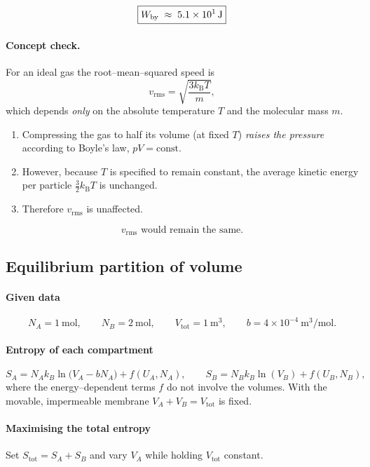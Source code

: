 \documentclass[12pt]{article}
\theoremstyle{definition} %
\theoremstyle{plain} %
\begin{document}
  \[
    \boxed{%
      W_{\text{by}} \;\approx\; \SI{5.1e1}{\joule}%
    }
\]
\paragraph{Concept check.}
For an ideal gas the root–mean–squared speed is
\[
  v_{\mathrm{rms}}
  = \sqrt{\frac{3k_{\mathrm B}T}{m}},
\]
which depends \emph{only} on the absolute temperature \(T\) and the molecular mass \(m\).

\begin{enumerate}[label=\textbf{\alph*.}]
  \item Compressing the gas to half its volume (at fixed \(T\)) \emph{raises the pressure} according to Boyle’s law, \(pV=\text{const.}\)
  \item However, because \(T\) is specified to remain constant, the average kinetic energy per particle \(\tfrac{3}{2}k_{\mathrm B}T\) is unchanged.
  \item Therefore \(v_{\mathrm{rms}}\) is unaffected.
\end{enumerate}

\[
  \boxed{\text{\(v_{\mathrm{rms}}\) would remain the same.}}
\]
\subsection*{Equilibrium partition of volume}

\paragraph{Given data}
\[
  N_A = 1~\text{mol}, \qquad
  N_B = 2~\text{mol}, \qquad
  V_{\text{tot}} = 1~\text{m}^{3}, \qquad
  b = 4\times 10^{-4}~\text{m}^{3}\!\big/\text{mol}.
\]

\paragraph{Entropy of each compartment}
\[
  S_A = N_A k_B \ln\!\bigl(V_A - bN_A\bigr) + f(U_A,N_A),
  \qquad
  S_B = N_B k_B \ln(V_B) + f(U_B,N_B),
\]
where the energy–dependent terms \(f\) do not involve the volumes.
With the movable, impermeable membrane \(V_A+V_B = V_{\text{tot}}\) is fixed.

\paragraph{Maximising the total entropy}
Set \(S_{\text{tot}} = S_A + S_B\) and vary \(V_A\) while holding
\(V_{\text{tot}}\) constant.
\end{document}
